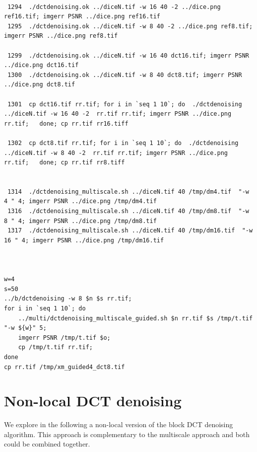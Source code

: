 \documentclass{ipol}
\begin{document}
\begin{verbatim}

 1294  ./dctdenoising.ok ../diceN.tif -w 16 40 -2 ../dice.png ref16.tif; imgerr PSNR ../dice.png ref16.tif 
 1295  ./dctdenoising.ok ../diceN.tif -w 8 40 -2 ../dice.png ref8.tif; imgerr PSNR ../dice.png ref8.tif 

 1299  ./dctdenoising.ok ../diceN.tif -w 16 40 dct16.tif; imgerr PSNR ../dice.png dct16.tif 
 1300  ./dctdenoising.ok ../diceN.tif -w 8 40 dct8.tif; imgerr PSNR ../dice.png dct8.tif 
 
 1301  cp dct16.tif rr.tif; for i in `seq 1 10`; do  ./dctdenoising ../diceN.tif -w 16 40 -2  rr.tif rr.tif; imgerr PSNR ../dice.png rr.tif;   done; cp rr.tif rr16.tiff
 
 1302  cp dct8.tif rr.tif; for i in `seq 1 10`; do  ./dctdenoising ../diceN.tif -w 8 40 -2  rr.tif rr.tif; imgerr PSNR ../dice.png rr.tif;   done; cp rr.tif rr8.tiff
 
 
 1314  ./dctdenoising_multiscale.sh ../diceN.tif 40 /tmp/dm4.tif  "-w 4 " 4; imgerr PSNR ../dice.png /tmp/dm4.tif
 1316  ./dctdenoising_multiscale.sh ../diceN.tif 40 /tmp/dm8.tif  "-w 8 " 4; imgerr PSNR ../dice.png /tmp/dm8.tif
 1317  ./dctdenoising_multiscale.sh ../diceN.tif 40 /tmp/dm16.tif  "-w 16 " 4; imgerr PSNR ../dice.png /tmp/dm16.tif
 
 

w=4
s=50
../b/dctdenoising -w 8 $n $s rr.tif; 
for i in `seq 1 10`; do
	../multi/dctdenoising_multiscale_guided.sh $n rr.tif $s /tmp/t.tif "-w ${w}" 5; 
	imgerr PSNR /tmp/t.tif $o; 
	cp /tmp/t.tif rr.tif; 
done
cp rr.tif /tmp/xm_guided4_dct8.tif

\end{verbatim}




\section{Non-local DCT denoising} 

We explore in the following a non-local version of the block DCT denoising
algorithm. This approach is complementary to the multiscale approach and both 
could be combined together.
\end{document}
